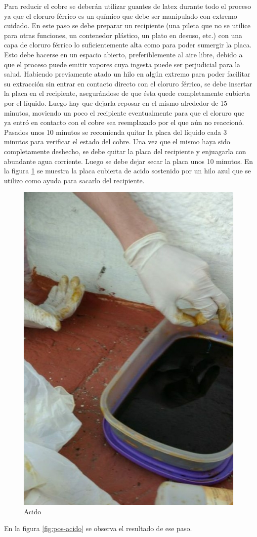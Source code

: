 Para reducir el cobre se deberán utilizar guantes de latex durante todo el proceso ya que el cloruro férrico es un químico que debe ser manipulado con extremo cuidado. 
En este paso se debe preparar un recipiente (una pileta que no se utilice para otras funciones, un contenedor plástico, un plato en desuso, etc.) con una capa de cloruro férrico lo suficientemente alta como para poder sumergir la placa. Esto debe hacerse en un espacio abierto, preferiblemente al aire libre, debido a que el proceso puede emitir vapores cuya ingesta puede ser perjudicial para la salud. Habiendo previamente atado un hilo en algún extremo para poder facilitar su extracción sin entrar en contacto directo con el cloruro férrico, se debe insertar la placa en el recipiente, asegurándose de que ésta quede completamente cubierta por el líquido. Luego hay que dejarla reposar en el mismo alrededor de 15 minutos, moviendo un poco el recipiente eventualmente para que el cloruro que ya entró en contacto con el cobre sea reemplazado por el que aún no reaccionó. Pasados unos 10 minutos se recomienda quitar la placa del líquido cada 3 minutos para verificar el estado del cobre. Una vez que el mismo haya sido completamente deshecho, se debe quitar la placa del recipiente y enjuagarla con abundante agua corriente. Luego se debe dejar secar la placa unos 10 minutos.
En la figura \ref{fig:acido} se muestra la placa cubierta de acido sostenido por un hilo azul que se utilizo como ayuda para sacarlo del recipiente.
\begin{figure}[ht!]
	\centering
	\includegraphics[width=0.4\linewidth]{imagenes/pcbeando/acido.jpeg}
	\caption{Acido}
	\label{fig:acido}
\end{figure}


En la figura \ref{fig:pos-acido} se observa el resultado de ese paso.

